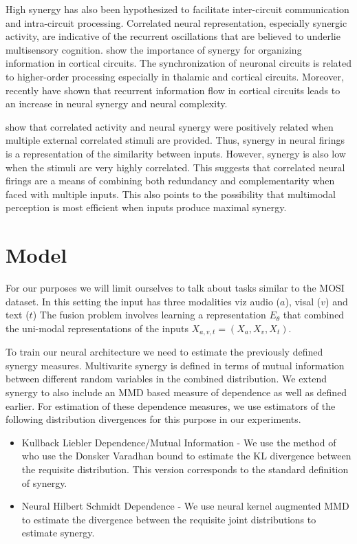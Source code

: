 \documentclass[letterpaper]{article} %
\begin{document}
High synergy has also been hypothesized to facilitate inter-circuit communication and intra-circuit processing. Correlated neural representation, especially synergic activity, are indicative of the recurrent oscillations that are believed to underlie multisensory cognition\citep{ hasselmo2002proposed, hernandez2020medial, honey2017switching}. \citet{fries2015rhythms, yu2008small} show the importance of synergy for organizing information in cortical circuits. The synchronization of neuronal circuits is related to higher-order processing \citep{vinck2015arousal} especially in thalamic and cortical circuits. Moreover, \citet{sherrill2021synergistic} recently have shown that recurrent information flow in cortical circuits leads to an increase in neural synergy and neural complexity. 

\citet{sherrill2020correlated} show that correlated activity and neural synergy were positively related when multiple external correlated stimuli are provided. Thus, synergy in neural firings is a representation of the similarity between inputs. However, synergy is also low when the stimuli are very highly correlated. This suggests that correlated neural firings are a means of combining both redundancy and complementarity when faced with multiple inputs. This also points to the possibility that multimodal perception is most efficient when inputs produce maximal synergy. 




\section{Model}

For our purposes we will limit ourselves to talk about tasks similar to the MOSI dataset. In this setting the input has three modalities viz audio ($a$), visal ($v$) and text ($t$) The fusion problem involves learning a representation $E_{\theta}$ that combined the uni-modal representations of the inputs $X_{a, v, t}=(X_{a}, X_{v}, X_{t})$.

To train our neural architecture we need to estimate the previously defined synergy measures. Multivarite synergy is defined in terms of mutual information between different random variables in the combined distribution. We extend synergy to also include an MMD based measure of dependence as well as defined earlier. For estimation of these dependence measures, we use estimators of the following distribution divergences for this purpose in our experiments. 

\begin{itemize}
    \item Kullback Liebler Dependence/Mutual Information -  We use the method of \citet{belghazi2018mine} who use the Donsker Varadhan bound \citep{donsker1985large,belghazi2018mine} to estimate the KL divergence between the requisite distribution. This version corresponds to the standard definition of synergy.
    \item Neural Hilbert Schmidt Dependence - We use neural kernel augmented MMD \citep{liu2020learning} to estimate the divergence between the requisite joint distributions to estimate synergy.
\end{itemize}
\end{document}

